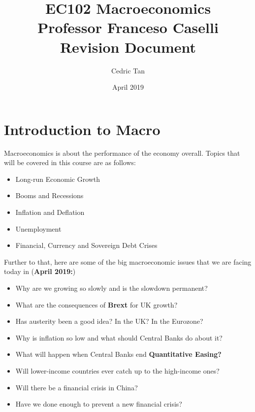 \documentclass[12pt, letterpaper]{article}
\title{
	{EC102 Macroeconomics}\\
	{\large{Professor Franceso Caselli}}\\
	{\large{Revision Document}}
}
\author{Cedric Tan}
\date{April 2019}
\begin{document}
\maketitle
{}

\newpage
\tableofcontents
\newpage

\section{Introduction to Macro}
Macroeconomics is about the performance of the economy overall. Topics that will be covered in this course are as follows:
\begin{itemize}
	\item Long-run Economic Growth
	\item Booms and Recessions
	\item Inflation and Deflation
	\item Unemployment
	\item Financial, Currency and Sovereign Debt Crises
\end{itemize}

Further to that, here are some of the big macroeconomic issues that we are facing today in (\textbf{April 2019:})
\begin{itemize}
	\item Why are we growing so slowly and is the slowdown permanent?
	\item What are the consequences of \textbf{Brext} for UK growth?
	\item Has austerity been a good idea? In the UK? In the Eurozone?
	\item Why is inflation so low and what should Central Banks do about it?
	\item What will happen when Central Banks end \textbf{Quantitative Easing?}
	\item Will lower-income countries ever catch up to the high-income ones?
	\item Will there be a financial crisis in China?
	\item Have we done enough to prevent a new financial crisis?
\end{itemize}
\end{document}
